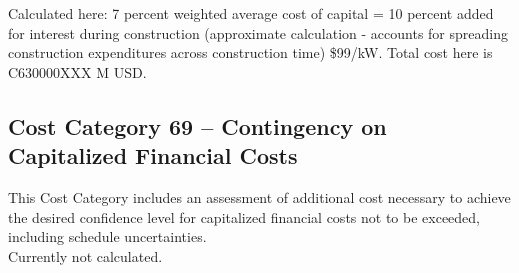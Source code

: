 Calculated here: 7 percent weighted average cost of capital = 10 percent added for interest during 
construction (approximate calculation - accounts for spreading construction expenditures across construction time) \$99/kW. Total cost here is C630000XXX M USD.

\subsection*{Cost Category 69 – Contingency on Capitalized Financial Costs}
This Cost Category includes an assessment of additional cost necessary to achieve the desired confidence level for capitalized financial costs not to be exceeded, including schedule uncertainties.\\

Currently not calculated.



